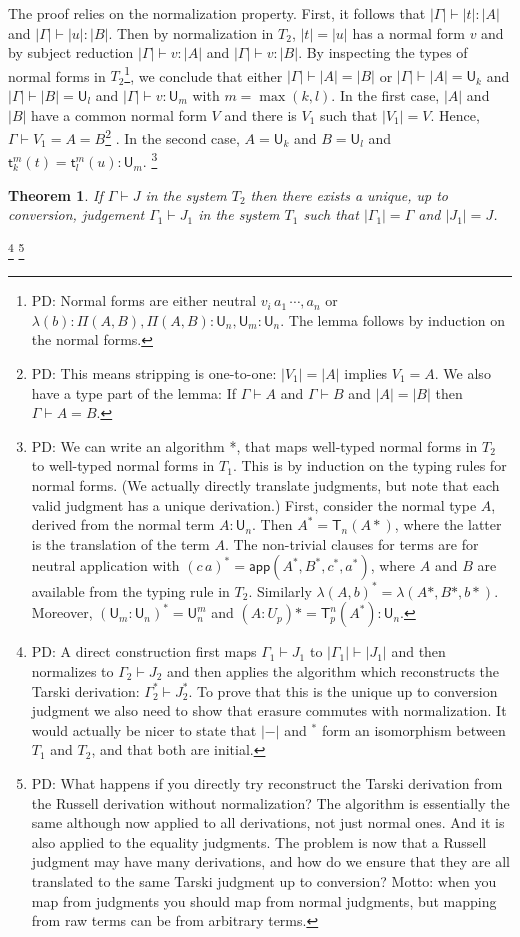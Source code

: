 \documentclass[11pt,a4paper]{article}
\newtheorem{theorem}{Theorem}[section]
\theoremstyle{definition}
\def\UU{\mathsf{U}}
\newcommand{\APP}{\mathsf{app}}
\newcommand{\T}{\mathsf{T}}
\newcommand{\sT}{\mathsf{t}}
\begin{document}
The proof relies on the normalization property. First, it follows that $|\Gamma | \vdash |t|:|A|$ and $|\Gamma | \vdash |u|:|B|$. Then by normalization in $T_2$, $| t | = | u |$ has a normal form $v$  and by subject reduction
$|\Gamma | \vdash v : |A|$ and $|\Gamma | \vdash v : |B|$. By inspecting the types of normal forms in $T_2$\footnote{PD: Normal forms are either neutral $v_i\,a_1\,\cdots,a_n$ or $\lambda(b) : \Pi(A,B), \Pi(A,B) : \UU_n, \UU_m : \UU_n$. The lemma follows by induction on the normal forms.}, we conclude that either $|\Gamma | \vdash |A| = |B|$ or $|\Gamma | \vdash |A| = \UU_k$ and $|\Gamma | \vdash |B| = \UU_l$ and $|\Gamma | \vdash v :\UU_m$ with $m = \max(k,l)$. In the first case,  $|A|$ and $|B|$ have a common normal form $V$ and there is $V_1$ such that $| V_1 |  = V$. Hence, $\Gamma \vdash V_1 = A = B$\footnote{PD: This means stripping is one-to-one: $|V_1| = |A|$ implies $V_1 = A$. We also have a type part of the lemma: If $\Gamma\vdash A$ and $\Gamma\vdash B$ and $|A| = |B|$ then $\Gamma\vdash A = B$. } . In the second case, $A = \UU_k$ and $B = \UU_l$ and $\sT_k^m(t) = \sT_l^m(u):\UU_m$.
\footnote{PD: We can write an algorithm *, that maps well-typed normal forms in $T_2$ to well-typed normal forms in $T_1$.
This is by induction on the typing rules for normal forms. (We actually directly translate judgments, but note that each valid judgment has a unique derivation.) First, consider the normal type $A$, derived from the normal term $A : \UU_n$. Then $A^* = \T_n(A*)$, where the latter is the translation of the term $A$. The non-trivial clauses for terms are for neutral application with $(c\,a)^* = \APP(A^*,B^*,c^*,a^*)$, where $A$ and $B$ are available from the typing rule in $T_2$. Similarly $\lambda(A,b)^* = \lambda(A*,B*,b*)$. Moreover, $(\UU_m : \UU_n)^* = \UU^m_n$ and $(A : U_p)* = \T^n_p(A^*) : \UU_n$.}

\begin{theorem}
  If $\Gamma\vdash J$ in the system $T_2$ then there exists a unique, up to conversion, judgement $\Gamma_1\vdash J_1$
  in the system $T_1$ such that $|\Gamma_1| = \Gamma$ and $|J_1| = J$.
\end{theorem}
\footnote{PD:  A direct construction first maps $\Gamma_1\vdash J_1$ to $|\Gamma_1|\vdash |J_1|$ and then normalizes to $\Gamma_2 \vdash J_2$ and then applies the algorithm which reconstructs the Tarski derivation: $\Gamma_2^*\vdash J_2^*$. To prove that this is the unique up to conversion judgment we also need to show that erasure commutes with normalization. It would actually be nicer to state that $|-|$ and $^*$ form an isomorphism between $T_1$ and $T_2$, and that both are initial.}
\footnote{PD: What happens if you directly try reconstruct the Tarski derivation from the Russell derivation without normalization? The algorithm is essentially the same although now applied to all derivations, not just normal ones. And it is also applied to the equality judgments. The problem is now that a Russell judgment may have many derivations, and how do we ensure that they are all translated to the same Tarski judgment up to conversion?  Motto: when you map from judgments you should map from normal judgments, but mapping from raw terms can be from arbitrary terms.}
\end{document}
